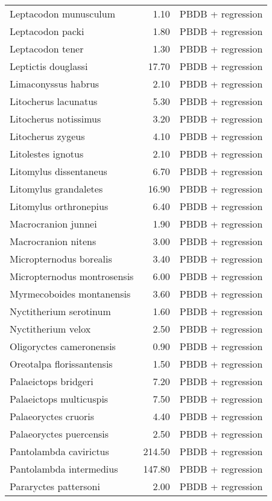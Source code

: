 \begin{table}[ht]
\begin{tabular}{lrl}
  Leptacodon munusculum & 1.10 & PBDB + regression \\ 
  Leptacodon packi & 1.80 & PBDB + regression \\ 
  Leptacodon tener & 1.30 & PBDB + regression \\ 
  Leptictis douglassi & 17.70 & PBDB + regression \\ 
  Limaconyssus habrus & 2.10 & PBDB + regression \\ 
  Litocherus lacunatus & 5.30 & PBDB + regression \\ 
  Litocherus notissimus & 3.20 & PBDB + regression \\ 
  Litocherus zygeus & 4.10 & PBDB + regression \\ 
  Litolestes ignotus & 2.10 & PBDB + regression \\ 
  Litomylus dissentaneus & 6.70 & PBDB + regression \\ 
  Litomylus grandaletes & 16.90 & PBDB + regression \\ 
  Litomylus orthronepius & 6.40 & PBDB + regression \\ 
  Macrocranion junnei & 1.90 & PBDB + regression \\ 
  Macrocranion nitens & 3.00 & PBDB + regression \\ 
  Micropternodus borealis & 3.40 & PBDB + regression \\ 
  Micropternodus montrosensis & 6.00 & PBDB + regression \\ 
  Myrmecoboides montanensis & 3.60 & PBDB + regression \\ 
  Nyctitherium serotinum & 1.60 & PBDB + regression \\ 
  Nyctitherium velox & 2.50 & PBDB + regression \\ 
  Oligoryctes cameronensis & 0.90 & PBDB + regression \\ 
  Oreotalpa florissantensis & 1.50 & PBDB + regression \\ 
  Palaeictops bridgeri & 7.20 & PBDB + regression \\ 
  Palaeictops multicuspis & 7.50 & PBDB + regression \\ 
  Palaeoryctes cruoris & 4.40 & PBDB + regression \\ 
  Palaeoryctes puercensis & 2.50 & PBDB + regression \\ 
  Pantolambda cavirictus & 214.50 & PBDB + regression \\ 
  Pantolambda intermedius & 147.80 & PBDB + regression \\ 
  Pararyctes pattersoni & 2.00 & PBDB + regression \\ 

\end{tabular}
\end{table}
